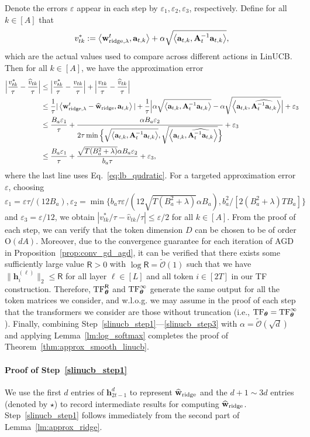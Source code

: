 \documentclass[10pt]{article}
\renewcommand{\hat}{\widehat}
\newcommand{\eps}{\varepsilon}
\newcommand{\<}{\left\langle}
\renewcommand{\>}{\right\rangle}
\newcommand{\lth}{{(\ell)}}
\newcommand{\TF}{{\rm TF}}
\newcommand{\ridge}{{\rm ridge}}
\newcommand{\partd}{{d}}
\newcommand{\temp}{{\tau}}
\newcommand{\tcO}{{\tilde{\mathcal O}}}
\newcommand{\totlen}{{T}}
\newcommand{\clipval}{{\mathsf{R}}}
\newcommand{\conO}{{\mathrm{O}}}
\def\bA{{\mathbf A}}
\def\btheta{{\boldsymbol \theta}}
\def\ba{{\mathbf a}}
\def\bh{{\mathbf h}}
\def\bw{{\mathbf w}}
\begin{document}
Denote the errors $\eps$ appear in each step by $\eps_1,\eps_2,\eps_3$, respectively. Define for all $k\in[A]$ that $$
v^{*}_{tk}:=\<\bw^t_{\ridge,\lambda},\ba_{t,k}\>+\alpha\sqrt{\<\ba_{t,k}, {\bA_t^{-1} \ba_{t,k}}\>},
$$ which are the actual values used to compare across different actions in LinUCB. Then  for all $k\in[A]$, we have the approximation error
\begin{align*}
    \Big|\frac{v_{tk}^*}{\temp}-\frac{\hat v_{tk}}{\temp}\Big|
    &\leq
     \Big|\frac{v_{tk}^*}{\temp}- \frac{v_{tk}}{\temp}\Big|+ \Big|\frac{v_{tk}}{\temp}-\frac{\hat v_{tk}}{\temp}\Big|\\
     &\leq
   \frac1\temp |\<\bw^t_{\ridge,\lambda}-\hat \bw_{\ridge},\ba_{t,k}\>|+\frac1\temp\Big|\alpha\sqrt{\<\ba_{t,k}, {\bA_t^{-1} \ba_{t,k}}\>}-\alpha\sqrt{\<\ba_{t,k}, \widehat{\bA_t^{-1} \ba_{t,k}}\>}\Big|+\eps_3
    \\&\leq
    \frac{B_a\eps_1}\temp+\frac{\alpha B_a\eps_2}{2\temp\min\Big\{\sqrt{\<\ba_{t,k}, {\bA_t^{-1} \ba_{t,k}}\>},\sqrt{\<\ba_{t,k}, \widehat{\bA_t^{-1} \ba_{t,k}}\>}
    \Big\}}+\eps_3\\
    &\leq \frac{B_a\eps_1}\temp+\frac{\sqrt{T(B_a^2+\lambda)}  \alpha B_a\eps_2}{b_a\temp}+\eps_3,
\end{align*}
where the last line uses Eq.~\eqref{eq:lb_qudratic}.
For a targeted approximation error $\eps$, choosing
 $\eps_1=\eps\temp/(12B_a),\eps_2=\min\{b_a\temp\eps/(12\sqrt{T(B_a^2+\lambda)}  \alpha B_a),b_a^2/[2(B_a^2+\lambda)TB_a]\}$ and $\eps_3=\eps/12$, we obtain $|v_{tk}^*/\temp-\hat v_{tk}/\temp|\leq \eps/2$ for all $k\in[A]$.
 From the proof of each step, we can verify that the token dimension $D$ can be chosen to be of order $\conO(dA)$. Moreover, due to the convergence guarantee for each iteration of AGD in Proposition~\ref{prop:conv_gd_agd}, it can be verified that there exists some sufficiently large value $\clipval>0$ with $\log \clipval=\tcO(1)$ such that  we have $\| \bh_i^{\lth} \|_{2} \leq\clipval$
 for all layer $\ell\in[L]$ and all token $i\in[2\totlen]$ in our TF construction. Therefore, $\TF^\clipval_\btheta$ and $\TF^\infty_\btheta$ generate the same output for all the token matrices we consider, and w.l.o.g. we  may assume in the proof of each step  that the  transformers we consider are those without truncation (i.e., $\TF_\btheta=\TF_\btheta^\infty$).
Finally, combining Step~\ref{slinucb_step1}---\ref{slinucb_step3} with $\alpha=\tcO(\sqrt{d})$ and applying Lemma~\ref{lm:log_softmax} completes the proof of Theorem~\ref{thm:approx_smooth_linucb}.
\paragraph{Proof of Step~\ref{slinucb_step1}} We use the first $d$ entries of $\bh_{2t-1}^{\partd}$ to represent $\hat\bw_{\ridge}$ and the $d+1\sim 3d$ entries (denoted by $\star$) to record intermediate results for computing $\hat\bw_{\ridge}$. Step~\ref{slinucb_step1} follows immediately from the second part of Lemma~\ref{lm:approx_ridge}.
\end{document}
